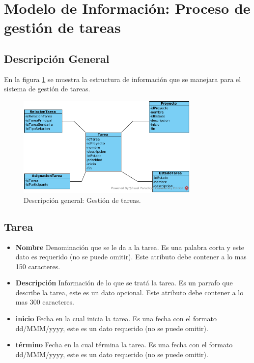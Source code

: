 \section{Modelo de Información: Proceso de gestión de tareas}

\subsection{Descripción General}
En la figura \ref{fig:MOD02} se muestra la estructura de información que se manejara para el sistema de gestión de tareas.

\begin{figure}[htb]
\centering
\includegraphics[width=0.8\textwidth]{./images/Modelo_Gestion_Tareas.png}
\caption{Descripción general: Gestión de tareas.} \label{fig:MOD02}
\end{figure}

\newpage

\subsection{Tarea}
\begin{itemize}
	\item \textbf{Nombre} Denominación que se le da a la tarea. Es una palabra corta y este dato es requerido (no se puede omitir). Este atributo debe contener a lo mas 150 caracteres.
	\item \textbf{Descripción} Información de lo que se tratá la tarea. Es un parrafo que describe la tarea, este es un dato opcional. Este atributo debe contener a lo mas 300 caracteres.
	\item \textbf{inicio} Fecha en la cual inicia la tarea. Es una fecha con el formato dd/MMM/yyyy, este es un dato requerido (no se puede omitir).
	\item \textbf{término} Fecha en la cual términa la tarea. Es una fecha con el formato dd/MMM/yyyy, este es un dato requerido (no se puede omitir).
\end{itemize}

